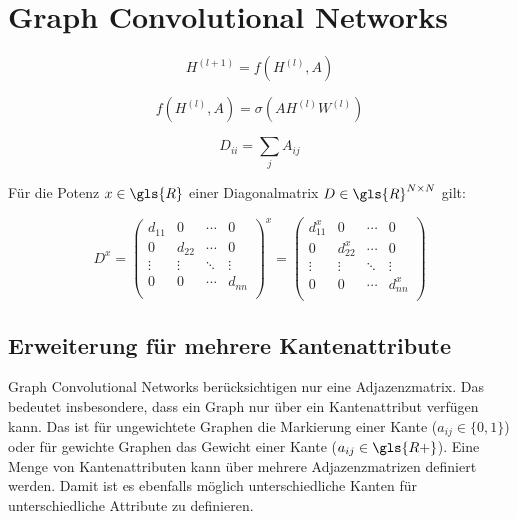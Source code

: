 \chapter{Graph Convolutional Networks}

\begin{equation}
  H^{(l+1)} = f(H^{(l)}, A)
\end{equation}

\begin{equation}
  f(H^{(l)}, A) = \sigma(AH^{(l)}W^{(l)})
\end{equation}

\begin{equation}
  D_{ii} = \sum_j A_{ij}
\end{equation}

Für die Potenz $x \in \gls{R}$ einer Diagonalmatrix $D \in \gls{R}^{N \times N}$ gilt:

\begin{equation}
  D^x = \begin{pmatrix}
    d_{11} & 0 & \cdots & 0\\
    0 & d_{22} & \cdots & 0\\
    \vdots & \vdots & \ddots & \vdots\\
    0 & 0 & \cdots & d_{nn}\\
  \end{pmatrix}^x = \begin{pmatrix}
    d_{11}^x & 0 & \cdots & 0\\
    0 & d_{22}^x & \cdots & 0\\
    \vdots & \vdots & \ddots & \vdots\\
    0 & 0 & \cdots & d_{nn}^x\\
  \end{pmatrix}
\end{equation}

\section{Erweiterung für mehrere Kantenattribute}

Graph Convolutional Networks berücksichtigen nur eine Adjazenzmatrix.
Das bedeutet insbesondere, dass ein Graph nur über ein Kantenattribut verfügen kann.
Das ist für ungewichtete Graphen die Markierung einer Kante ($a_{ij} \in \lbrace 0, 1 \rbrace$) oder für gewichte Graphen das Gewicht einer Kante ($a_{ij} \in \gls{R+}$).
Eine Menge von Kantenattributen kann über mehrere Adjazenzmatrizen definiert werden.
Damit ist es ebenfalls möglich unterschiedliche Kanten für unterschiedliche Attribute zu definieren.

